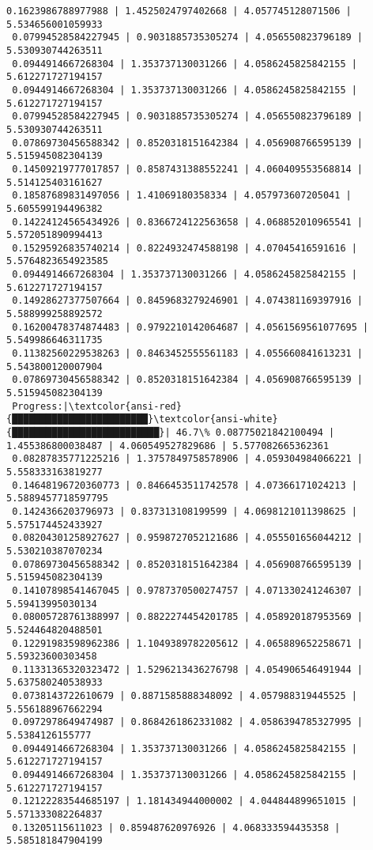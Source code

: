 \documentclass[11pt]{article}
\begin{document}
\begin{Verbatim}[commandchars=\\\{\}]
 0.1623986788977988 | 1.4525024797402668 | 4.057745128071506 | 5.534656001059933
 0.07994528584227945 | 0.9031885735305274 | 4.056550823796189 | 5.530930744263511
 0.0944914667268304 | 1.353737130031266 | 4.0586245825842155 | 5.612271727194157
 0.0944914667268304 | 1.353737130031266 | 4.0586245825842155 | 5.612271727194157
 0.07994528584227945 | 0.9031885735305274 | 4.056550823796189 | 5.530930744263511
 0.07869730456588342 | 0.8520318151642384 | 4.056908766595139 | 5.515945082304139
 0.14509219777017857 | 0.8587431388552241 | 4.060409553568814 | 5.514125403161627
 0.18587689831497056 | 1.41069180358334 | 4.057973607205041 | 5.605599194496382
 0.14224124565434926 | 0.8366724122563658 | 4.068852010965541 | 5.572051890994413
 0.15295926835740214 | 0.8224932474588198 | 4.07045416591616 | 5.5764823654923585
 0.0944914667268304 | 1.353737130031266 | 4.0586245825842155 | 5.612271727194157
 0.14928627377507664 | 0.8459683279246901 | 4.074381169397916 | 5.588999258892572
 0.16200478374874483 | 0.9792210142064687 | 4.0561569561077695 | 5.549986646311735
 0.11382560229538263 | 0.8463452555561183 | 4.055660841613231 | 5.543800120007904
 0.07869730456588342 | 0.8520318151642384 | 4.056908766595139 | 5.515945082304139
 Progress:|\textcolor{ansi-red}{████████████████████████}\textcolor{ansi-white}{██████████████████████████}| 46.7\% 0.08775021842100494 | 1.455386800038487 | 4.060549527829686 | 5.577082665362361
 0.08287835771225216 | 1.3757849758578906 | 4.059304984066221 | 5.558333163819277
 0.14648196720360773 | 0.8466453511742578 | 4.07366171024213 | 5.5889457718597795
 0.1424366203796973 | 0.837313108199599 | 4.0698121011398625 | 5.575174452433927
 0.08204301258927627 | 0.9598727052121686 | 4.055501656044212 | 5.530210387070234
 0.07869730456588342 | 0.8520318151642384 | 4.056908766595139 | 5.515945082304139
 0.14107898541467045 | 0.9787370500274757 | 4.071330241246307 | 5.59413995030134
 0.08005728761388997 | 0.8822274454201785 | 4.058920187953569 | 5.524464820488501
 0.12291983598962386 | 1.1049389782205612 | 4.065889652258671 | 5.59323600303458
 0.11331365320323472 | 1.5296213436276798 | 4.054906546491944 | 5.637580240538933
 0.0738143722610679 | 0.8871585888348092 | 4.057988319445525 | 5.556188967662294
 0.0972978649474987 | 0.8684261862331082 | 4.0586394785327995 | 5.5384126155777
 0.0944914667268304 | 1.353737130031266 | 4.0586245825842155 | 5.612271727194157
 0.0944914667268304 | 1.353737130031266 | 4.0586245825842155 | 5.612271727194157
 0.12122283544685197 | 1.181434944000002 | 4.044844899651015 | 5.571333082264837
 0.13205115611023 | 0.859487620976926 | 4.068333594435358 | 5.585181847904199

\end{Verbatim}
\end{document}
